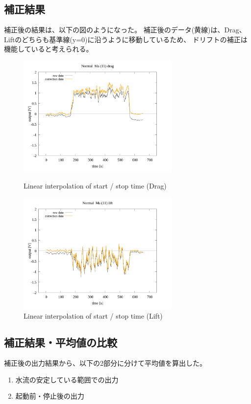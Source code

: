 \documentclass[twocolumn,a4j]{jsarticle}
\begin{document}
\subsection{補正結果}
補正後の結果は、以下の図のようになった。
補正後のデータ(黄線)は、Drag、Liftのどちらも基準線(y=0)に沿うように移動しているため、
ドリフトの補正は機能していると考えられる。
\begin{figure}[htbp]
    \footnotesize
    \begin{center}
        \includegraphics[width=80mm]{images/Normal_ma(11)_drag_04.png}
        \caption{Linear interpolation of start / stop time (Drag)}
        \includegraphics[width=80mm]{images/Normal_ma(11)_lift_04.png}
        \caption{Linear interpolation of start / stop time (Lift)}
    \end{center}
\end{figure}
\subsection{補正結果・平均値の比較}
補正後の出力結果から、以下の2部分に分けて平均値を算出した。
\begin{enumerate}[(1)]
    \item 水流の安定している範囲での出力
    \item 起動前・停止後の出力
\end{enumerate} 
\end{document}
